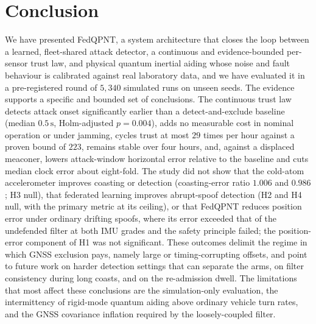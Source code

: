 \documentclass[journal]{IEEEtran}
\begin{document}
\section{Conclusion}
\label{sec:conclusion}
We have presented FedQPNT, a system architecture that closes the loop between a learned, fleet-shared
attack detector, a continuous and evidence-bounded per-sensor trust law, and physical quantum inertial
aiding whose noise and fault behaviour is calibrated against real laboratory data, and we have evaluated it
in a pre-registered round of $5{,}340$ simulated runs on unseen seeds. The evidence supports a specific and
bounded set of conclusions. The continuous trust law detects attack onset significantly earlier than a
detect-and-exclude baseline (median $0.5\,\mathrm{s}$, Holm-adjusted $p=0.004$), adds no measurable cost in nominal
operation or under jamming, cycles trust at most $29$ times per hour against a proven bound of $223$, remains stable over
four hours, and, against a displaced meaconer, lowers attack-window horizontal error relative to the baseline and cuts median
clock error about eight-fold. The study did not show that the cold-atom accelerometer improves coasting
or detection (coasting-error ratio $1.006$ and $0.986$; H3 null), that federated learning improves abrupt-spoof
detection (H2 and H4 null, with the primary metric at its ceiling), or that FedQPNT reduces position error under
ordinary drifting spoofs, where its error exceeded that of the undefended filter at both IMU grades and the
safety principle failed; the position-error component of H1 was not significant. These outcomes delimit the regime in which GNSS exclusion pays, namely large or
timing-corrupting offsets, and point to future work on harder detection settings that can separate the arms, on filter consistency during long
coasts, and on the re-admission dwell. The limitations that most affect these conclusions are the
simulation-only evaluation, the intermittency of rigid-mode quantum aiding above ordinary vehicle turn rates, and the
GNSS covariance inflation required by the loosely-coupled filter.
\end{document}
